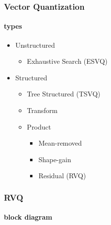 \begin{frame}
\frametitle{Vector Quantization}
\framesubtitle{types}
\logoCSIPCPL\mypagenum
	\begin{itemize}
		\item Unstructured
			\begin{itemize}
				\item Exhaustive Search (ESVQ)
			\end{itemize}
		\item Structured
		\begin{itemize}
			\item Tree Structured (TSVQ)
			\item Transform
			\item Product
				\begin{itemize}
					\item Mean-removed
					\item Shape-gain
					\item Residual (RVQ)
				\end{itemize}
		\end{itemize}
	\end{itemize}
\end{frame}




\begin{frame}[plain]
\frametitle{RVQ}
\framesubtitle{block diagram}
\logoCSIPCPL\mypagenum
\begin{changemargin}{-1.35in}{0in}
\begin{figure}
\centering			
{}
\end{figure}
\end{changemargin}
\end{frame}


